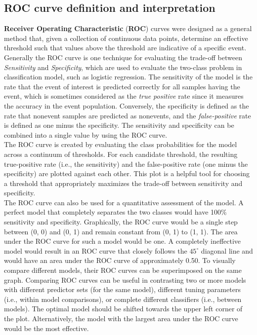 \documentclass{article}%
\begin{document}
\subsection{ROC curve definition and interpretation}
\textbf{Receiver Operating Characteristic} (\textbf{ROC}) curves were designed as a general method that, given a collection of continuous data points, determine an effective threshold such that values above the threshold are indicative of a specific event. \\
\indent Generally the ROC curve is one technique for evaluating the trade-off between \emph{Sensitivity} and \emph{Specificity}, which are used to evaluate the two-class problem in classification model, such as logistic regression. The sensitivity of the model is the rate that the event
of interest is predicted correctly for all samples having the event, which is sometimes considered as the \emph{true positive} rate since it measures the accuracy in the event population. Conversely, the specificity is defined as the rate that nonevent samples are predicted as nonevents, and the \emph{false-positive} rate is defined as one minus the specificity. The sensitivity and specificity can be combined into a single value by using the ROC curve.\\
\indent The ROC curve is created by evaluating the class probabilities for the model across a continuum of thresholds. For each candidate threshold, the resulting true-positive rate (i.e., the sensitivity) and the false-positive rate (one minus the specificity) are plotted against each other. This plot is a helpful tool for choosing a threshold that appropriately maximizes the trade-off between sensitivity and specificity.\\
\indent The ROC curve can also be used for a quantitative assessment of the model. A perfect model that completely separates the two classes would have 100\% sensitivity and specificity. Graphically, the ROC curve would be a single step between (0, 0) and (0, 1) and remain constant from (0, 1) to (1, 1). The area under the ROC curve for such a model would be one. A completely ineffective model would result in an ROC curve that closely follows the $45^{\circ}$ diagonal line and would have an area under the ROC curve of approximately 0.50. To visually compare different models, their ROC curves can be superimposed on the same graph. Comparing ROC curves can be useful in contrasting two or more models with different predictor sets (for the same model), different tuning parameters (i.e., within model comparisons), or complete different classifiers (i.e., between models). The optimal model should be shifted towards the upper left corner of the plot. Alternatively, the model with the largest area under the ROC curve would be the most effective.\\
\end{document}
